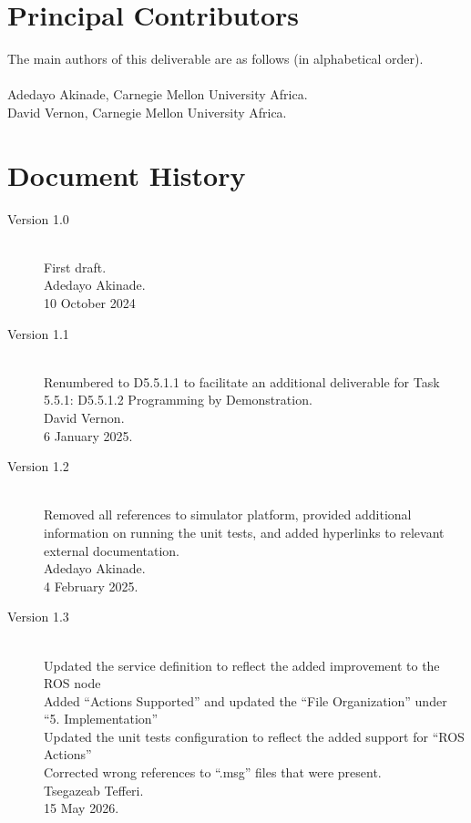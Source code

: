 \documentclass{CSSRforAfrica}
\newcommand{\blank}{~\\}
\begin{document}
\pagebreak
\section*{Principal Contributors}
\label{contributors}
The main authors of this deliverable are as follows (in alphabetical order).
\blank
~
\blank
Adedayo Akinade, Carnegie Mellon University Africa.\\ 
David Vernon, Carnegie Mellon University Africa.\\   

 

  

\newpage
\section*{Document History}
\label{document_history}

\begin{description}

\item [Version 1.0]~\\
First draft. \\
Adedayo  Akinade. \\            
10 October 2024                                          
\item [Version 1.1]~\\
Renumbered to D5.5.1.1 to facilitate an additional deliverable for Task 5.5.1: D5.5.1.2  Programming by Demonstration.\\
David Vernon. \\                                   
6 January 2025.   

\item [Version 1.2]~\\
Removed all references to simulator platform, provided additional information on running the unit tests, and added hyperlinks to relevant external documentation.\\
Adedayo Akinade. \\                                   
4 February 2025.

\item [Version 1.3]~\\
Updated the service definition to reflect the added improvement to the ROS node \\
Added ``Actions Supported'' and updated the ``File Organization'' under ``5. Implementation'' \\
Updated the unit tests configuration to reflect the added support for ``ROS Actions'' \\
Corrected wrong references to ``.msg'' files that were present.\\
Tsegazeab Tefferi. \\                                   
15 May 2026.

\end{description}
\end{document}
